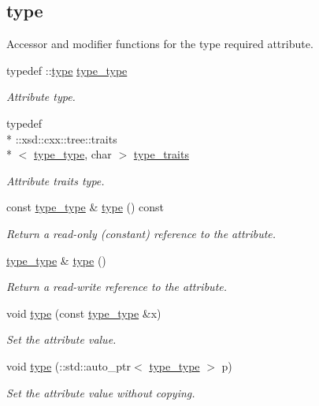 \subsection*{type}
\label{_amgrp599dcce2998a6b40b1e38e8c6006cb0a}%
Accessor and modifier functions for the type required attribute. \begin{DoxyCompactItemize}
\item 
typedef \+::\hyperlink{classtype}{type} \hyperlink{classDataArray__t_a484a0509e4f141d9970d75881703a51e}{type\+\_\+type}
\begin{DoxyCompactList}\small\item\em Attribute type. \end{DoxyCompactList}\item 
typedef \\*
\+::xsd\+::cxx\+::tree\+::traits\\*
$<$ \hyperlink{classDataArray__t_a484a0509e4f141d9970d75881703a51e}{type\+\_\+type}, char $>$ \hyperlink{classDataArray__t_af1dc5f097a8645ae42b57eb3a0b10fa2}{type\+\_\+traits}
\begin{DoxyCompactList}\small\item\em Attribute traits type. \end{DoxyCompactList}\item 
const \hyperlink{classDataArray__t_a484a0509e4f141d9970d75881703a51e}{type\+\_\+type} \& \hyperlink{classDataArray__t_a6ec3c246d1a2fddc7052bcde2cb6bdf7}{type} () const 
\begin{DoxyCompactList}\small\item\em Return a read-\/only (constant) reference to the attribute. \end{DoxyCompactList}\item 
\hyperlink{classDataArray__t_a484a0509e4f141d9970d75881703a51e}{type\+\_\+type} \& \hyperlink{classDataArray__t_a29f3ed42a5bf8df9437ece5f63c02301}{type} ()
\begin{DoxyCompactList}\small\item\em Return a read-\/write reference to the attribute. \end{DoxyCompactList}\item 
void \hyperlink{classDataArray__t_ae4fd6c47e992055ec42cc1949b60da2a}{type} (const \hyperlink{classDataArray__t_a484a0509e4f141d9970d75881703a51e}{type\+\_\+type} \&x)
\begin{DoxyCompactList}\small\item\em Set the attribute value. \end{DoxyCompactList}\item 
void \hyperlink{classDataArray__t_afa90d226889ba3e7baa5c8e9dba594d2}{type} (\+::std\+::auto\+\_\+ptr$<$ \hyperlink{classDataArray__t_a484a0509e4f141d9970d75881703a51e}{type\+\_\+type} $>$ p)
\begin{DoxyCompactList}\small\item\em Set the attribute value without copying. \end{DoxyCompactList}\end{DoxyCompactItemize}
